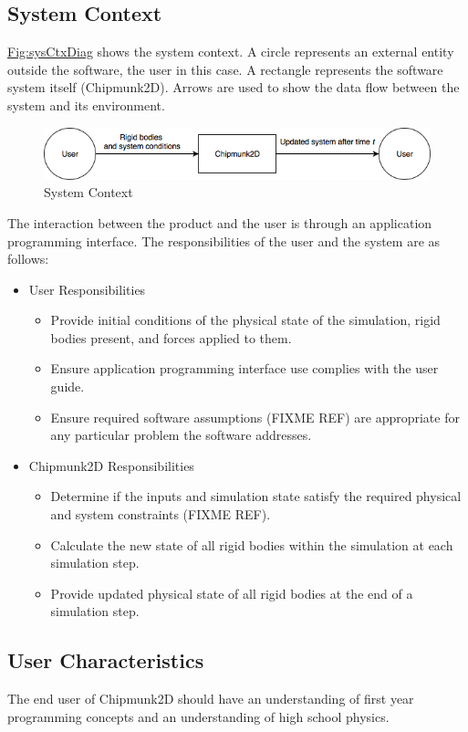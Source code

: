\documentclass[12pt]{article}
\begin{document}
\subsection{System Context}
\label{Sec:SysContext}
\hyperref[Figure:sysCtxDiag]{Fig:sysCtxDiag} shows the system context. A circle represents an external entity outside the software, the user in this case. A rectangle represents the software system itself (Chipmunk2D). Arrows are used to show the data flow between the system and its environment.
\begin{figure}
\begin{center}
\includegraphics[width=\textwidth]{../../../datafiles/GamePhysics/sysctx.png}
\caption{System Context}
\label{Figure:sysCtxDiag}
\end{center}
\end{figure}
The interaction between the product and the user is through an application programming interface. The responsibilities of the user and the system are as follows:
\begin{itemize}
\item{User Responsibilities}
\begin{itemize}
\item{Provide initial conditions of the physical state of the simulation, rigid bodies present, and forces applied to them.}
\item{Ensure application programming interface use complies with the user guide.}
\item{Ensure required software assumptions (FIXME REF) are appropriate for any particular problem the software addresses.}
\end{itemize}
\item{Chipmunk2D Responsibilities}
\begin{itemize}
\item{Determine if the inputs and simulation state satisfy the required physical and system constraints (FIXME REF).}
\item{Calculate the new state of all rigid bodies within the simulation at each simulation step.}
\item{Provide updated physical state of all rigid bodies at the end of a simulation step.}
\end{itemize}
\end{itemize}
\subsection{User Characteristics}
\label{Sec:UserChars}
The end user of Chipmunk2D should have an understanding of first year programming concepts and an understanding of high school physics.
\end{document}
